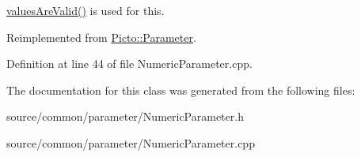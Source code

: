 \hyperlink{class_picto_1_1_parameter_a3443808da4c3edf26f2c3c3772d95b10}{values\-Are\-Valid()} is used for this. 

Reimplemented from \hyperlink{class_picto_1_1_parameter_a94c0e4191ffcc0bd642b647d24557082}{Picto\-::\-Parameter}.



Definition at line 44 of file Numeric\-Parameter.\-cpp.



The documentation for this class was generated from the following files\-:\begin{DoxyCompactItemize}
\item 
source/common/parameter/Numeric\-Parameter.\-h\item 
source/common/parameter/Numeric\-Parameter.\-cpp\end{DoxyCompactItemize}

